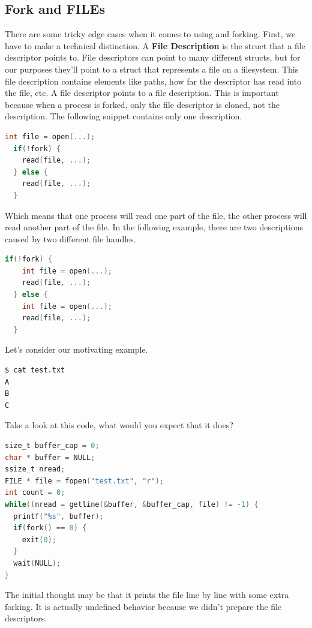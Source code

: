 \subsection{Fork and FILEs}

There are some tricky edge cases when it comes to using  and forking.
First, we have to make a technical distinction.
A \textbf{File Description} is the struct that a file descriptor points to.
File descriptors can point to many different structs, but for our purposes they'll point to a struct that represents a file on a filesystem.
This file description contains elements like paths, how far the descriptor has read into the file, etc.
A file descriptor points to a file description.
This is important because when a process is forked, only the file descriptor is cloned, not the description.
The following snippet contains only one description.

\begin{lstlisting}[language=C]
  int file = open(...);
  if(!fork) {
    read(file, ...);
  } else {
    read(file, ...);
  }
\end{lstlisting}

Which means that one process will read one part of the file, the other process will read another part of the file.
In the following example, there are two descriptions caused by two different file handles.

\begin{lstlisting}[language=C]
  if(!fork) {
    int file = open(...);
    read(file, ...);
  } else {
    int file = open(...);
    read(file, ...);
  }
\end{lstlisting}

Let's consider our motivating example.

\begin{lstlisting}[language=bash]
$ cat test.txt
A
B
C
\end{lstlisting}

Take a look at this code, what would you expect that it does?

\begin{lstlisting}[language=C]
size_t buffer_cap = 0;
char * buffer = NULL;
ssize_t nread;
FILE * file = fopen("test.txt", "r");
int count = 0;
while((nread = getline(&buffer, &buffer_cap, file) != -1) {
  printf("%s", buffer);
  if(fork() == 0) { 
    exit(0);
  }
  wait(NULL);
}
\end{lstlisting}

The initial thought may be that it prints the file line by line with some extra forking.
It is actually undefined behavior because we didn't prepare the file descriptors.

